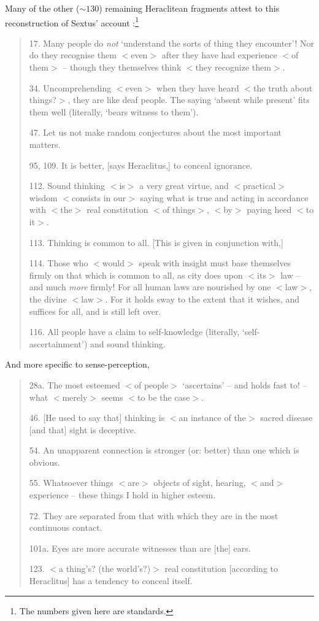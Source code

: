 Many of the other ($\sim130$) remaining Heraclitean fragments attest to this reconstruction of Sextus' account \cite{Robinson1987}:\footnote{The numbers given here are standards.}
\begin{quote}
17. Many people do \textit{not} `understand the sorts of thing they encounter'! Nor do they recognise them $<$even$>$ after they have had experience $<$of them$>$ -- though they themselves think $<$they recognize them$>$.

34. Uncomprehending $<$even$>$ when they have heard $<$the truth about things?$>$, they are like deaf people. The saying `absent while present' fits them well (literally, `bears witness to them').

47. Let us not make random conjectures about the most important matters.

95, 109. It is better, [says Heraclitus,] to conceal ignorance.

112. Sound thinking $<$is$>$ a very great virtue, and $<$practical$>$ wisdom $<$consists in our$>$ saying what is true and acting in accordance with $<$the$>$ real constitution $<$of things$>$, $<$by$>$ paying heed $<$to it$>$.

113. Thinking is common to all. [This is given in conjunction with,]

114. Those who $<$would$>$ speak with insight must base themselves firmly on that which is common to all, as city does upon $<$its$>$ law -- and much \textit{more} firmly! For all human laws are nourished by one $<$law$>$, the divine $<$law$>$. For it holds sway to the extent that it wishes, and suffices for all, and is still left over.

116. All people have a claim to self-knowledge (literally, `self-ascertainment') and sound thinking.
\end{quote}
And more specific to sense-perception,
\begin{quote}
28a. The most esteemed $<$of people$>$ `ascertains' -- and holds fast to! -- what $<$merely$>$ seems $<$to be the case$>$.

46. [He used to say that] thinking is $<$an instance of the$>$ sacred disease [and that] sight is deceptive.

54. An unapparent connection is stronger (or: better) than one which is obvious.

55. Whatsoever things $<$are$>$ objects of sight, hearing, $<$and$>$ experience -- these things I hold in higher esteem.

72. They are separated from that with which they are in the most continuous contact.

101a. Eyes are more accurate witnesses than are [the] ears.

123. $<$a thing's? (the world's?)$>$ real constitution [according to Heraclitus] has a tendency to conceal itself.
\end{quote}

